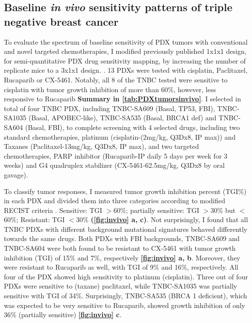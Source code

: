 \subsection{Baseline \textit{in vivo} sensitivity patterns of triple negative breast cancer}
To evaluate the spectrum of baseline sensitivity of PDX tumors with conventional and novel targeted chemotherapies, I modified previously published 1x1x1 design, for semi-quantitative PDX drug sensitivity mapping, by increasing the number of replicate mice to a 3x1x1 design. \cite{gao2015high, migliardi2012inhibition}. 
 13 PDXs were tested with cisplatin, Paclitaxel, Rucaparib or CX-5461. Notably, all 8 of the TNBC tested were sensitive to cisplatin with tumor growth inhibition of more than 60\%, however, less responsive to Rucaparib \textbf{Summary in \autoref{tab:PDXtumorsinvivo}}. 
I selected in total of four TNBC PDX, including TNBC-SA609 (Basal, TP53, FBI), TNBC-SA1035 (Basal, APOBEC-like), TNBC-SA535 (Basal, BRCA1 def) and TNBC-SA604 (Basal, FBI), to complete screening with 4 selected drugs, including two standard chemotherapies, platinum (cisplatin-(2mg/kg, \ac{Q3Dx8}, \ac{IP} max)) and Taxanes (Paclitaxel-13mg/kg, \ac{Q3Dx8}, \ac{IP} max), and two targeted chemotherapies, PARP inhibitor (Rucaparib-\ac{IP} daily 5 days per week for 3 weeks) and G4 quadruplex stabilizer (CX-5461-62.5mg/kg, \ac{Q3Dx8} by oral gavage). 



To classify tumor responses, I measured tumor growth inhibition percent (TGI\%) in each PDX and divided them into three categories according to modified RECIST criteria \cite{aykan2020objective}. Sensitive: \ac{TGI} $>$60\%; partially sensitive: \ac{TGI} $>$30\% but $<$60\%; Resistant: \ac{TGI} $<$30\% \textbf{(\autoref{fig:invivo} a, c)}.
Not surprisingly, I found that all TNBC PDXs with different background mutational signatures behaved differently towards the same drugs. Both PDXs with FBI backgrounds, TNBC-SA609 and TNBC-SA604 were both found to be resistant to CX-5461 with tumor growth inhibition (TGI) of 15\% and 7\%, respectively \textbf{\autoref{fig:invivo} a, b}. Moreover, they were resistant to Rucaparib as well, with \ac{TGI} of 9\% and 16\%, respectively.
All four of the PDX showed high sensitivity to platinum (cisplatin). Three out of four PDXs were sensitive to (taxane) paclitaxel, while TNBC-SA1035 was partially sensitive with \ac{TGI} of 34\%. Surprisingly, TNBC-SA535 (BRCA 1 deficient), which was expected to be very sensitive to Rucaparib, showed growth inhibition of only 36\%  (partially sensitive) \textbf{\autoref{fig:invivo} c}.


